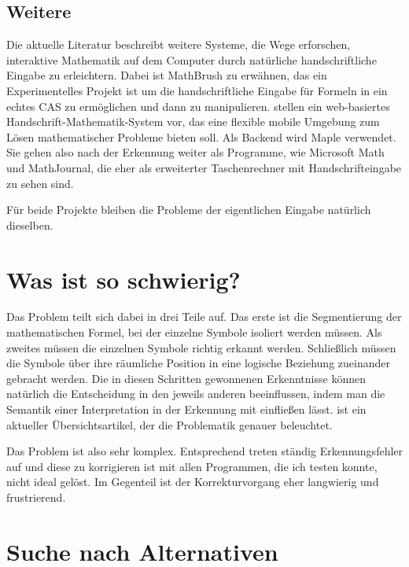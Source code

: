 \subsection{Weitere}
\label{sub:mathbrush}

Die aktuelle Literatur beschreibt weitere Systeme, die Wege erforschen, interaktive Mathematik auf dem Computer durch natürliche handschriftliche Eingabe zu erleichtern. Dabei ist MathBrush \cite{Labahn:2008p10301} zu erwähnen, das ein Experimentelles Projekt ist um die handschriftliche Eingabe für Formeln in ein echtes \ac{CAS} zu ermöglichen und dann zu manipulieren. \citet{Vuong:2010p10279} stellen ein web-basiertes Handschrift-Mathematik-System vor, das eine flexible mobile Umgebung zum Lösen mathematischer Probleme bieten soll. Als Backend wird Maple \cite{maple} verwendet. Sie gehen also nach der Erkennung weiter als Programme, wie Microsoft Math und MathJournal, die eher als erweiterter Taschenrechner mit Handschrifteingabe zu sehen sind.

Für beide Projekte bleiben die Probleme der eigentlichen Eingabe natürlich dieselben.

\section{Was ist so schwierig?}

Das Problem teilt sich dabei in drei Teile auf. Das erste ist die Segmentierung der mathematischen Formel, bei der einzelne Symbole isoliert werden müssen. Als zweites müssen die einzelnen Symbole richtig erkannt werden. Schließlich müssen die Symbole über ihre räumliche Position in eine logische Beziehung zueinander gebracht werden. Die in diesen Schritten gewonnenen Erkenntnisse können natürlich die Entscheidung in den jeweils anderen beeinflussen, indem man die Semantik einer Interpretation in der Erkennung mit einfließen lässt. \cite{Tapia:2007p9160} ist ein aktueller Übersichtsartikel, der die Problematik genauer beleuchtet.

Das Problem ist also sehr komplex. Entsprechend treten ständig Erkennungsfehler auf und diese zu korrigieren ist mit allen Programmen, die ich testen konnte, nicht ideal gelöst. Im Gegenteil ist der Korrekturvorgang eher langwierig und frustrierend.

\section{Suche nach Alternativen}
\label{sec:alternativen}

